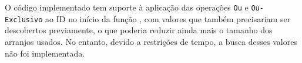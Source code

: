 O código implementado tem suporte à aplicação das operações \texttt{Ou} e \texttt{Ou-Exclusivo} ao ID no início da função \Espalha, com valores que também precisariam ser descobertos previamente, o que poderia reduzir ainda mais o tamanho dos arranjos usados. No entanto, devido a restrições de tempo, a busca desses valores não foi implementada.
